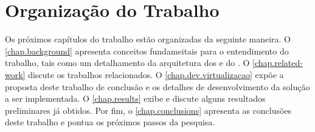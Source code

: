 \section{Organização do Trabalho}
\label{sec.organization}

Os próximos capítulos do trabalho estão organizadas da seguinte maneira. O \autoref{chap.background} apresenta conceitos fundameitais para o entendimento do trabalho, tais como um detalhamento da arquitetura dos \lws e do \nanvix. O \autoref{chap.related-work} discute os trabalhos relacionados. O \autoref{chap.dev.virtualizacao} expõe a proposta deste trabalho de conclusão e os detalhes de desenvolvimento da solução a ser implementada. O \autoref{chap.results} exibe e discute alguns resultados preliminares já obtidos. Por fim, o \autoref{chap.conclusions} apresenta as conclusões deste trabalho e pontua os próximos passos da pesquisa.
